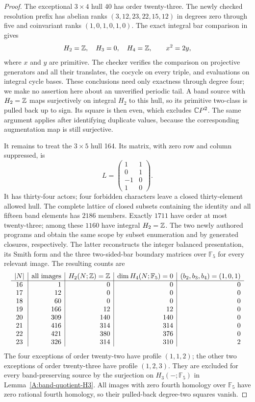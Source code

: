 \begin{proof}
The exceptional $3\times4$ hull 40 has order twenty-three.
The newly checked resolution prefix has abelian ranks
$(3,12,23,22,15,12)$ in degrees zero through five and
coinvariant ranks $(1,0,1,0,1,0)$.
The exact integral bar comparison in
 gives
\[
 H_2=\mathbb{Z},\quad H_3=0,\quad H_4=\mathbb{Z},\qquad x^2=2y,
\]
where $x$ and $y$ are primitive. The checker verifies the
comparison on projective generators and all their translates,
the cocycle on every triple, and evaluations on integral cycle
bases. These conclusions need only exactness through degree
four; we make no assertion here about an unverified periodic
tail. A band source with $H_2=\mathbb{Z}$ maps surjectively on integral
$H_2$ to this hull, so its primitive two-class is pulled back
up to sign. Its square is then even, which excludes $\mathbb{C}P^2$.
The same argument applies after identifying duplicate values,
because the corresponding augmentation map is still surjective.

It remains to treat the $3\times5$ hull 164. Its matrix, with
zero row and column suppressed, is
\[
 L=\begin{pmatrix}1&1\\0&1\\-1&0\\1&0\end{pmatrix}.
\]
It has thirty-four actors; four forbidden characters leave a
closed thirty-element allowed hull. The complete lattice of
closed subsets containing the identity and all fifteen band
elements has $2186$ members. Exactly $1711$ have order at most
twenty-three; among these $1160$ have integral $H_2=\mathbb{Z}$.
The two newly authored programs
 and
 obtain the same scope
by subset enumeration and by generated closures, respectively.
The latter reconstructs the integer balanced presentation,
its Smith form and the three two-sided-bar boundary matrices
over $\mathbb F_5$ for every relevant image. The resulting
counts are
\[
\begin{array}{c|r|r|r|r}
 |N|&\text{all images}&H_2(N;\mathbb{Z})=\mathbb{Z}
  &\dim H_4(N;\mathbb F_5)=0
  &(b_2,b_3,b_4)=(1,0,1)\\\hline
16&1&0&0&0\\17&12&0&0&0\\18&60&0&0&0\\
19&166&12&12&0\\20&309&140&140&0\\
21&416&314&314&0\\22&421&380&376&0\\
23&326&314&310&2
\end{array}
\]
The four exceptions of order twenty-two have profile $(1,1,2)$;
the other two exceptions of order twenty-three have profile
$(1,2,3)$. They are excluded for every band-preserving source
by the surjection on $H_3(-;\mathbb F_5)$ in
Lemma~\ref{A:band-quotient-H3}. All images with zero fourth
homology over $\mathbb F_5$ have zero rational fourth homology,
so their pulled-back degree-two squares vanish.


\end{proof}
